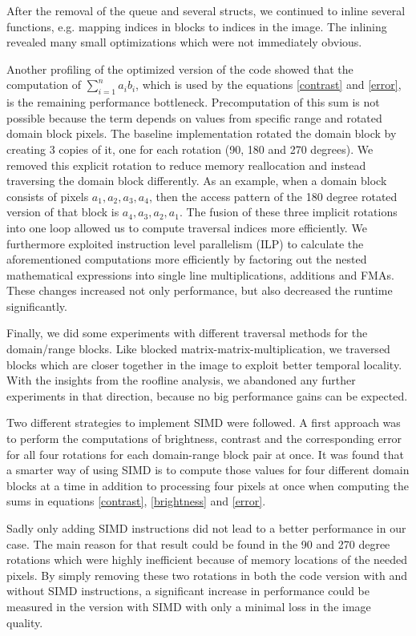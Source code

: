 After the removal of the queue and several structs, we continued to inline several functions, e.g. mapping indices in blocks
to indices in the image. The inlining revealed many small optimizations which were not immediately obvious. 

Another profiling of the optimized version of the code showed that the computation of $\sum_{i=1}^n a_i b_i$, which is used by the equations 
\ref{contrast} and \ref{error}, is the remaining performance bottleneck. Precomputation of this sum is not possible
because the term depends on values from specific range and rotated domain block pixels. The baseline implementation rotated
the domain block by creating 3 copies of it, one for each rotation (90, 180 and 270 degrees). We removed this explicit rotation
to reduce memory reallocation and instead traversing the domain block differently. As an example, when a domain block consists
of pixels $a_1, a_2, a_3, a_4$, then the access pattern of the 180 degree rotated version of that block is $a_4, a_3, a_2, a_1$.
The fusion of these three implicit rotations into one loop allowed us to compute traversal indices more efficiently.
We furthermore exploited instruction level parallelism (ILP) to calculate the aforementioned computations more efficiently
by factoring out the nested mathematical expressions into single line multiplications, additions and FMAs.
These changes increased not only performance, but also decreased the runtime significantly.

Finally, we did some experiments with different traversal methods for the domain/range blocks. Like blocked matrix-matrix-multiplication,
we traversed blocks which are closer together in the image to exploit better temporal locality.
With the insights from the roofline analysis, we abandoned any further experiments in that direction, because no big performance
gains can be expected.

 Two different strategies to implement SIMD were
followed. A first approach was to perform the computations of brightness,
contrast and the corresponding error for all four rotations for each
domain-range block pair at once. It was found that a smarter way of using SIMD
is to compute those values for four different domain blocks at a time in
addition to processing four pixels at once when computing the sums in equations
\ref{contrast}, \ref{brightness} and \ref{error}.

Sadly only adding SIMD instructions did not lead to a better performance in our
case. The main reason for that result could be found in the 90 and 270 degree
rotations which were highly inefficient because of memory locations of the
needed pixels. By simply removing these two rotations in both the code version
with and without SIMD instructions, a significant increase in performance could
be measured in the version with SIMD with only a minimal loss in the image
quality.


